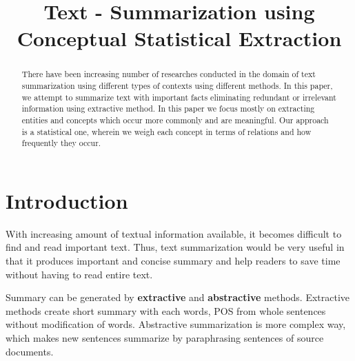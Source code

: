 \documentclass[conference]{IEEEtran}
\begin{document}
\title{Text - Summarization using Conceptual Statistical Extraction}


\author{
\and
{}
}
\graphicspath{ {/home/flipswitch/junkyard/text-summarizer/documentation/} }
\maketitle
\begin{abstract}
There have been increasing number of researches conducted in the domain of text summarization using different types of contexts using different methods. In this paper, we attempt to summarize text with important facts eliminating redundant or irrelevant information using extractive method. In this paper we focus mostly on extracting entities and concepts which occur more commonly and are meaningful. Our approach is a statistical one, wherein we weigh each concept in terms of relations and how frequently they occur.
\end{abstract}
\IEEEpeerreviewmaketitle



\section{Introduction}
With increasing amount of textual information available, it becomes difficult to find and read important text. Thus, text summarization would be very useful in that it produces important and concise summary and help readers to save time without having to read entire text.

Summary can be generated by \textbf{extractive} and \textbf{abstractive} methods. Extractive methods create short summary with each words, POS from whole sentences without modification of words. Abstractive summarization is more complex way, which makes new sentences summarize by paraphrasing sentences of source documents.
\end{document}
